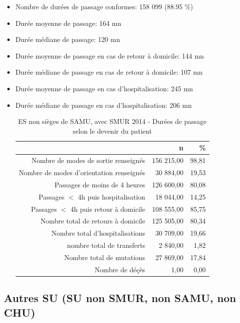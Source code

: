 \documentclass[]{article}
\begin{document}
\begin{itemize}
\itemsep1pt\parskip0pt
\item
  Nombre de durées de passage conformes: 158 099 (88.95 \%)
\item
  Durée moyenne de passage: 164 mn
\item
  Durée médiane de passage: 120 mn
\item
  Durée moyenne de passage en cas de retour à domicile: 144 mn
\item
  Durée médiane de passage en cas de retour à domicile: 107 mn
\item
  Durée moyenne de passage en cas d'hospitalisation: 245 mn
\item
  Durée médiane de passage en cas d'hospitalisation: 206 mn

  \begin{table}[ht]
  \centering
  \begin{tabular}{rrr}
    \hline
   & n & \% \\ 
    \hline
  Nombre de modes de sortie renseignés & 156 215,00 & 98,81 \\ 
    Nombre de modes d'orientation renseignés & 30 884,00 & 19,53 \\ 
    Passages de moins de 4 heures & 126 600,00 & 80,08 \\ 
    Passages $<$ 4h puis hospitalisation & 18 044,00 & 14,25 \\ 
    Passages $<$ 4h puis retour à domicile & 108 555,00 & 85,75 \\ 
    Nombre total de retours à domicile & 125 505,00 & 80,34 \\ 
    Nombre total d'hospitalisations & 30 709,00 & 19,66 \\ 
    nombre total de transferts & 2 840,00 & 1,82 \\ 
    Nombre total de mutations & 27 869,00 & 17,84 \\ 
    Nombre de déçès & 1,00 & 0,00 \\ 
     \hline
  \end{tabular}
  \caption{ES non sièges de SAMU, avec SMUR 2014 - Durées de passage selon le devenir du patient} 
  \end{table}
\end{itemize}

\subsection{Autres SU (SU non SMUR, non SAMU, non
CHU)}\label{autres-su-su-non-smur-non-samu-non-chu}
\end{document}
